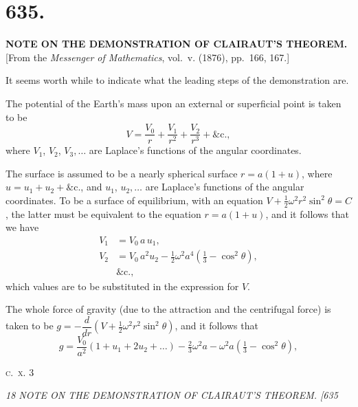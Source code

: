 \documentclass[12pt,a4paper]{article}
\begin{document}
\clearpage
\setcounter{page}{17}

\section*{635.}

\begin{center}
\textbf{NOTE ON THE DEMONSTRATION OF CLAIRAUT'S THEOREM.}\\[1em]
[From the \textit{Messenger of Mathematics}, vol.~v. (1876), pp.~166, 167.]
\end{center}

It seems worth while to indicate what the leading steps of the demonstration are.

The potential of the Earth's mass upon an external or superficial point is taken to be
\[
V = \frac{V_0}{r} + \frac{V_1}{r^2} + \frac{V_2}{r^3} + \&\text{c.},
\]
where $V_1$, $V_2$, $V_3, \ldots$ are Laplace's functions of the angular coordinates.

The surface is assumed to be a nearly spherical surface $r = a(1 + u)$, where $u = u_1 + u_2 + \&\text{c.}$, and $u_1$, $u_2, \ldots$ are Laplace's functions of the angular coordinates. To be a surface of equilibrium, with an equation $V + \tfrac{1}{2}\omega^2 r^2 \sin^2\theta = C$, the latter must be equivalent to the equation $r = a(1+u)$, and it follows that we have
\begin{align*}
V_1 &= V_0\, a\, u_1, \\
V_2 &= V_0\, a^2 u_2 - \tfrac{1}{2}\omega^2 a^4 (\tfrac{1}{3} - \cos^2\theta), \\
&\&\text{c.},
\end{align*}
which values are to be substituted in the expression for $V$.

The whole force of gravity (due to the attraction and the centrifugal force) is taken to be $g = -\dfrac{d}{dr}\!\left(V + \tfrac{1}{2}\omega^2 r^2 \sin^2\theta\right)$, and it follows that
\[
g = \frac{V_0}{a^2}(1 + u_1 + 2 u_2 + \ldots) - \tfrac{2}{3}\omega^2 a - \omega^2 a (\tfrac{1}{3} - \cos^2\theta),
\]

\hfill\textsc{c.~x.} \hfill 3

\clearpage
\setcounter{page}{18}

\begin{center}
\textit{18 \hfill NOTE ON THE DEMONSTRATION OF CLAIRAUT'S THEOREM. \hfill [635}
\end{center}
\end{document}
